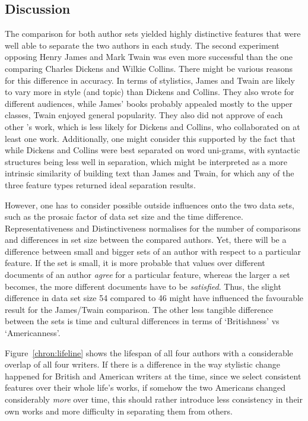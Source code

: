 \documentclass[a4paper,10pt,twoside,fleqn]{article}
\begin{document}
\subsection{Discussion}
The comparison for  both author sets yielded highly distinctive features
that were well able to separate the two authors in each study.
The second experiment opposing Henry James and Mark Twain was
even more successful than the one comparing Charles Dickens and Wilkie Collins.
There might be various reasons for this difference in accuracy.
In terms of stylistics, James and Twain are likely to vary more
in style (and topic) than Dickens and Collins.
They also wrote for different audiences, while James' books probably
appealed mostly to the upper classes, Twain enjoyed general
popularity. They also did not approve of each other 's work, which
is less likely for Dickens and Collins, who collaborated
on at least one work.
Additionally, one might consider this supported by the fact that
while Dickens and Collins were best separated on word uni-grams,
with syntactic structures being less well in separation, which
might be interpreted as a more intrinsic similarity of building
text than James and Twain, for which any of the three feature types
returned ideal separation results.

However, one has to consider possible outside influences
onto the two data sets, such as the prosaic factor of data set size
and the time difference.
Representativeness and Distinctiveness normalises for the number of
comparisons and differences in set size between the compared authors.
Yet, there will be a difference between small and bigger sets of an
author with respect to a particular feature. If the set is small,
it is more probable that values over different documents of
an author \emph{agree} for a particular feature, whereas the
larger a set becomes, the more different documents have to be
\emph{satisfied}.
Thus, the slight difference in data set size 54 compared to 46
might have influenced the favourable result for the James/Twain
comparison.
The other less tangible difference between the sets is time and
cultural differences in terms of `Britishness' vs `Americanness'.

Figure~\ref{chron:lifeline} shows the lifespan of all four authors
with a considerable overlap of all four writers.
If there is a difference in the way stylistic change happened
for British and American writers at the time, since
we select consistent features over their whole life's works,
if somehow the two Americans changed considerably \emph{more}
over time, this should rather introduce less consistency in
their own works and more difficulty in separating them from others.
\end{document}
